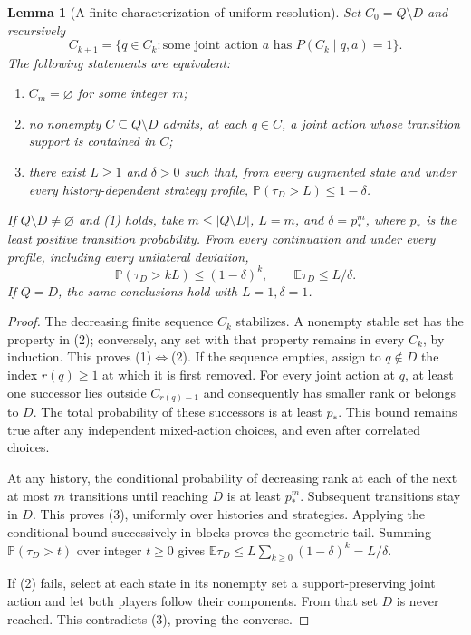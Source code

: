 \documentclass[11pt]{article}
\newtheorem{lemma}[theorem]{Lemma}
\theoremstyle{remark}\newtheorem{remark}[theorem]{Remark}
\newcommand{\E}{\mathbb E}
\newcommand{\Prb}{\mathbb P}
\begin{document}
\begin{lemma}[A finite characterization of uniform resolution]\label{lem:graph}
Set $C_0=Q\setminus D$ and recursively
\[
 C_{k+1}=\{q\in C_k:\text{some joint action }a
                  \text{ has }P(C_k\mid q,a)=1\}.
\]
The following statements are equivalent:
\begin{enumerate}
\item $C_m=\varnothing$ for some integer $m$;
\item no nonempty $C\subseteq Q\setminus D$ admits, at each $q\in C$, a joint action whose transition support is contained in $C$;
\item there exist $L\geq1$ and $\delta>0$ such that, from every augmented state and under every history-dependent strategy profile,
$\Prb(\tau_D>L)\leq1-\delta$.
\end{enumerate}
If $Q\setminus D\ne\varnothing$ and (1) holds, take $m\leq |Q\setminus D|$, $L=m$, and $\delta=p_*^m$, where $p_*$ is the least positive transition probability. From every continuation and under every profile, including every unilateral deviation,
\[
 \Prb(\tau_D>kL)\leq(1-\delta)^k,
 \qquad \E\tau_D\leq L/\delta.
\]
If $Q=D$, the same conclusions hold with $L=1,\delta=1$.
\end{lemma}
\begin{proof}
The decreasing finite sequence $C_k$ stabilizes. A nonempty stable set has the property in (2); conversely, any set with that property remains in every $C_k$, by induction. This proves (1)$\Leftrightarrow$(2). If the sequence empties, assign to $q\notin D$ the index $r(q)\geq1$ at which it is first removed. For every joint action at $q$, at least one successor lies outside $C_{r(q)-1}$ and consequently has smaller rank or belongs to $D$. The total probability of these successors is at least $p_*$. This bound remains true after any independent mixed-action choices, and even after correlated choices.

At any history, the conditional probability of decreasing rank at each of the next at most $m$ transitions until reaching $D$ is at least $p_*^m$. Subsequent transitions stay in $D$. This proves (3), uniformly over histories and strategies. Applying the conditional bound successively in blocks proves the geometric tail. Summing $\Prb(\tau_D>t)$ over integer $t\geq0$ gives $\E\tau_D\leq L\sum_{k\geq0}(1-\delta)^k=L/\delta$.

If (2) fails, select at each state in its nonempty set a support-preserving joint action and let both players follow their components. From that set $D$ is never reached. This contradicts (3), proving the converse.
\end{proof}
\end{document}
